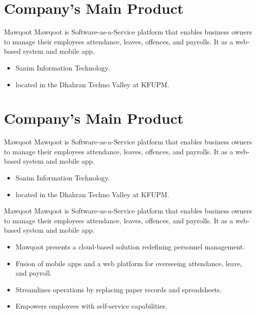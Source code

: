 \documentclass{loyola-beamer}
\begin{document}
\section{Company's Main Product}

\begin{frame}{Mawqoot}
Mawqoot is Software-as-a-Service platform that enables business owners 
  to manage their employees attendance, leaves, offences, and payrolls.
  It as a web-based system and mobile app.
	\vspace{\baselineskip}

  \begin{itemize}
    \item Sanim Information Technology.
    \item located in the Dhahran Techno Valley at KFUPM.
  \end{itemize}
\end{frame}

\section{Company's Main Product}

\begin{frame}{Mawqoot}
Mawqoot is Software-as-a-Service platform that enables business owners 
  to manage their employees attendance, leaves, offences, and payrolls.
  It as a web-based system and mobile app.
	\vspace{\baselineskip}

  \begin{itemize}
    \item Sanim Information Technology.
    \item located in the Dhahran Techno Valley at KFUPM.
  \end{itemize}
\end{frame}

\begin{frame}{Mawqoot}
Mawqoot is Software-as-a-Service platform that enables business owners 
  to manage their employees attendance, leaves, offences, and payrolls.
  It as a web-based system and mobile app.
	\vspace{\baselineskip}

    \begin{itemize}
        \item Mawqoot presents a cloud-based solution redefining personnel management.
        \item Fusion of mobile apps and a web platform for overseeing attendance, leave, and payroll.
        \item Streamlines operations by replacing paper records and spreadsheets.
        \item Empowers employees with self-service capabilities.
    \end{itemize}
\end{frame}
\end{document}
